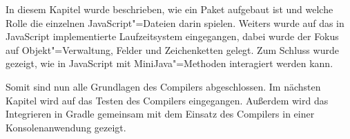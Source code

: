\vspace{4em}
In diesem Kapitel wurde beschrieben, wie ein Paket aufgebaut ist und welche Rolle die einzelnen JavaScript"=Dateien darin spielen. Weiters wurde auf das in JavaScript implementierte Laufzeitsystem eingegangen, dabei wurde der Fokus auf Objekt"=Verwaltung, Felder und Zeichenketten gelegt. Zum Schluss wurde gezeigt, wie in JavaScript mit MiniJava"=Methoden interagiert werden kann.

Somit sind nun alle Grundlagen des Compilers abgeschlossen. Im nächsten Kapitel wird auf das Testen des Compilers eingegangen. Außerdem wird das Integrieren in Gradle gemeinsam mit dem Einsatz des Compilers in einer Konsolenanwendung gezeigt.

